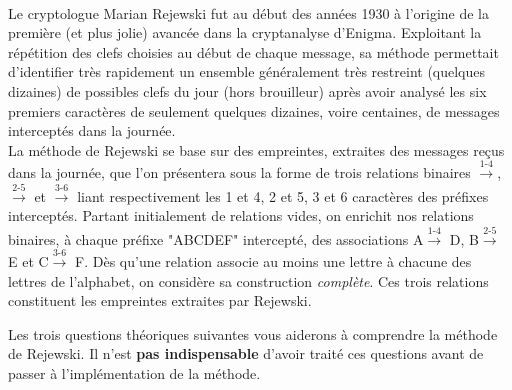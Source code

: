 \documentclass[11pt, a4paper]{article}
\begin{document}
\\
Le cryptologue Marian Rejewski fut au début des années 1930 à l'origine de la première (et plus
jolie) avancée dans la cryptanalyse d'Enigma. Exploitant la répétition des clefs choisies au début de chaque message, sa méthode
permettait d'identifier très rapidement un ensemble généralement très
restreint (quelques dizaines) de possibles clefs du jour (hors
brouilleur) après avoir analysé les six premiers caractères de seulement quelques dizaines, voire centaines, de messages interceptés dans la journée.\\
La méthode de Rejewski se base sur des empreintes, extraites des messages
reçus dans la journée, que l'on présentera sous la forme de trois
relations binaires $\overset{\text{1-4}}{\longrightarrow}$,
$\overset{\text{2-5}}{\longrightarrow}$ et $\overset{\text{3-6}}{\longrightarrow}$ liant
respectivement les 1\ier{} et 4\ieme, 2\ieme{} et 5\ieme{}, 3\ieme{}
et 6\ieme{} caractères des préfixes interceptés. Partant initialement
de relations vides, on enrichit nos relations binaires, à chaque préfixe "ABCDEF" intercepté, des associations
A$\overset{\text{1-4}}{\longrightarrow}$ D, B$\overset{\text{2-5}}{\longrightarrow}$ E
et C$\overset{\text{3-6}}{\longrightarrow}$ F. Dès qu'une relation associe
au moins une lettre à chacune des lettres de l'alphabet, on considère sa construction \emph{complète}. Ces trois relations constituent les empreintes extraites par Rejewski.


\vspace{0.3cm}

\noindent Les trois questions théoriques suivantes vous aiderons à comprendre la
méthode de Rejewski. Il n'est \textbf{pas indispensable} d'avoir
traité ces questions avant de passer à l'implémentation de la méthode.

\vspace{0.2cm}
\end{document}
